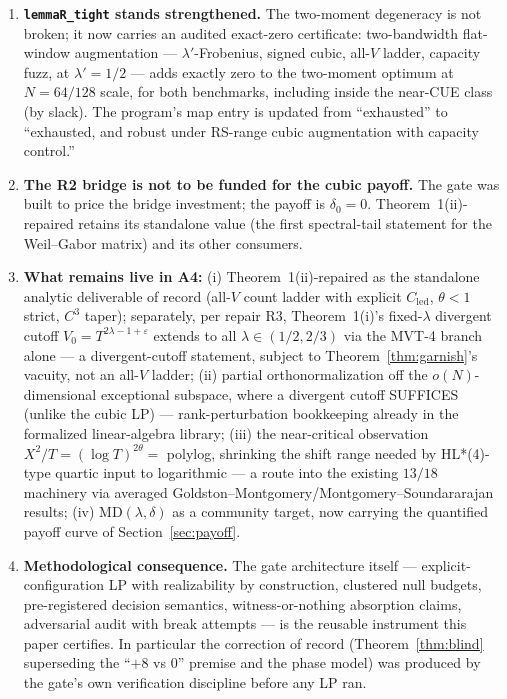 \documentclass[11pt]{article}
\theoremstyle{plain}
\theoremstyle{definition}
\theoremstyle{remark}
\newcommand{\Cled}{C_{\mathrm{led}}}
\begin{document}
\begin{enumerate}
\item \textbf{\texttt{lemmaR\_tight} stands strengthened.} The two-moment
  degeneracy is not broken; it now carries an audited exact-zero certificate:
  two-bandwidth flat-window augmentation --- $\lambda'$-Frobenius, signed cubic,
  all-$V$ ladder, capacity fuzz, at $\lambda' = 1/2$ --- adds exactly zero to the
  two-moment optimum at $N = 64/128$ scale, for both benchmarks, including inside
  the near-CUE class (by slack). The program's map entry is updated from
  ``exhausted'' to ``exhausted, and robust under RS-range cubic augmentation with
  capacity control.''
\item \textbf{The R2 bridge is not to be funded for the cubic payoff.} The gate
  was built to price the bridge investment; the payoff is $\delta_0 = 0$.
  Theorem~1(ii)-repaired retains its standalone value (the first spectral-tail
  statement for the Weil--Gabor matrix) and its other consumers.
\item \textbf{What remains live in A4:} (i) Theorem~1(ii)-repaired as the
  standalone analytic deliverable of record (all-$V$ count ladder with explicit
  $\Cled$, $\theta < 1$ strict, $C^3$ taper); separately, per repair R3,
  Theorem~1(i)'s fixed-$\lambda$ divergent cutoff
  $V_0 = T^{2\lambda - 1 + \varepsilon}$ extends to all
  $\lambda \in (1/2, 2/3)$ via the MVT-4 branch alone --- a divergent-cutoff
  statement, subject to Theorem~\ref{thm:garnish}'s vacuity, not an all-$V$
  ladder; (ii) partial orthonormalization off the $o(N)$-dimensional exceptional
  subspace, where a divergent cutoff SUFFICES (unlike the cubic LP) ---
  rank-perturbation bookkeeping already in the formalized linear-algebra library;
  (iii) the near-critical observation $X^2/T = (\log T)^{2\theta} = $ polylog,
  shrinking the shift range needed by HL*(4)-type quartic input to logarithmic ---
  a route into the existing $13/18$ machinery via averaged
  Goldston--Montgomery/Montgomery--Soundararajan results; (iv)
  $\mathrm{MD}(\lambda, \delta)$ as a community target, now carrying the
  quantified payoff curve of Section~\ref{sec:payoff}.
\item \textbf{Methodological consequence.} The gate architecture itself ---
  explicit-configuration LP with realizability by construction, clustered null
  budgets, pre-registered decision semantics, witness-or-nothing absorption
  claims, adversarial audit with break attempts --- is the reusable instrument
  this paper certifies. In particular the correction of record
  (Theorem~\ref{thm:blind} superseding the ``$+8$ vs $0$'' premise and the phase
  model) was produced by the gate's own verification discipline before any LP ran.
\end{enumerate}
\end{document}
